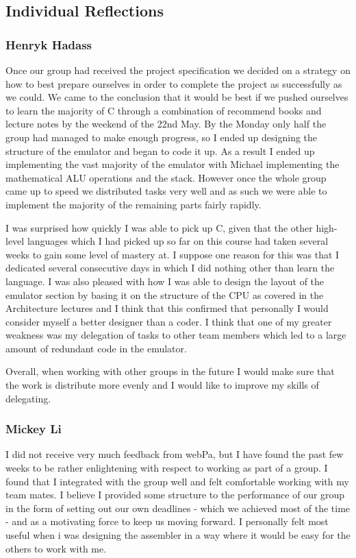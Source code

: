 \documentclass[11pt]{article}
\begin{document}
\subsection{Individual Reflections}

\subsubsection*{Henryk Hadass}
Once our group had received the project specification we decided on a strategy on how to best prepare ourselves in order to complete the project as successfully as we could. We came to the conclusion that it would be best if we pushed ourselves to learn the majority of C through a combination of recommend books and lecture notes by the weekend of the 22nd May. By the Monday only half the group had managed to make enough progress, so I ended up designing the structure of the emulator and began to code it up. As a result I ended up implementing the vast majority of the emulator with Michael implementing the mathematical ALU operations and the stack. However once the whole group came up to speed we distributed tasks very well and as such we were able to implement the majority of the remaining parts fairly rapidly. 

I was surprised how quickly I was able to pick up C, given that the other high-level languages which I had picked up so far on this course had taken several weeks to gain some level of mastery at. I suppose one reason for this was that I dedicated several consecutive days in which I did nothing other than learn the language. I was also pleased with how I was able to design the layout of the emulator section by basing it on the structure of the CPU as covered in the Architecture lectures and I think that this confirmed that personally I would consider myself a better designer than a coder. I think that one of my greater weakness was my delegation of tasks to other team members which led to a large amount of redundant code in the emulator.

Overall, when working with other groups in the future I would make sure that the work is distribute more evenly and I would like to improve my skills of delegating.



\subsubsection*{Mickey Li}
I did not receive very much feedback from webPa, but I have found the past few weeks to be rather enlightening with respect to working as part of a group. I found that I integrated with the group well and felt comfortable working with my team mates. I believe I provided some structure to the performance of our group in the form of setting out our own deadlines - which we achieved most of the time - and as a motivating force to keep us moving forward. I personally felt most useful when i was designing the assembler in a way where it would be easy for the others to work with me.
\end{document}
